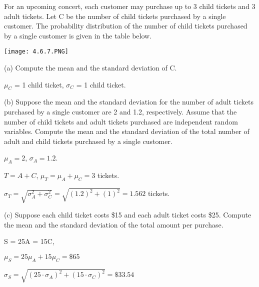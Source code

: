 \documentclass[../stats.tex]{subfiles}
\begin{document}
\pagebreak
\begin{example}
    For an upcoming concert, each customer may purchase up to 3 child tickets and 3 adult tickets. Let C be the number of child tickets purchased by a single customer. The probability distribution of the number of child tickets purchased by a single customer is given in the table below.
    \begin{center}
        \texttt{[image: 4.6.7.PNG]}
    \end{center}

    (a) Compute the mean and the standard deviation of C.

    $\mu_C$ = 1 child ticket, $\sigma_C$ = 1 child ticket.

    (b) Suppose the mean and the standard deviation for the number of adult tickets purchased by a single customer are 2 and 1.2, respectively. Assume that the number of child tickets and adult tickets purchased are independent random variables.
    Compute the mean and the standard deviation of the total number of adult and child tickets purchased by a single customer.

    $\mu_A = 2$, $\sigma_A=1.2$. 

    $T=A+C$, $\mu_T=\mu_A+\mu_C=3$ tickets.

    $\sigma_T=\sqrt{\sigma_A^2 + \sigma_C^2}=\sqrt{(1.2)^2+(1)^2}=1.562$ tickets.

    (c) Suppose each child ticket costs \$15 and each adult ticket costs \$25. Compute the mean and the standard deviation of the total amount per purchase.

    S = 25A = 15C, 
    
    $\mu_S = 25\mu_A+15\mu_C = \$65$

    $\sigma_S=\sqrt{(25\cdot\sigma_A)^2+(15\cdot\sigma_C)^2}=\$33.54$
\end{example}
\end{document}
